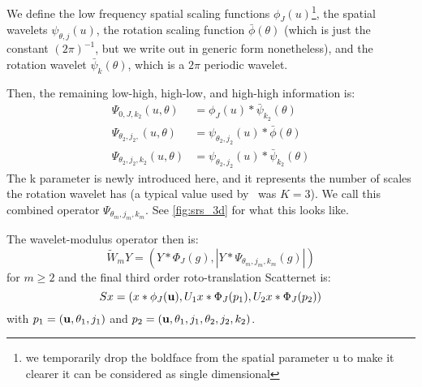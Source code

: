   We define the low frequency spatial scaling functions $\phi_J(u)$\footnote{we
  temporarily drop the boldface from the spatial parameter u to make it clearer
  it can be considered as single dimensional}, the spatial wavelets
  $\psi_{\theta, j}(u)$, the rotation scaling function $\bar{\phi}(\theta)$
  (which is just the constant $(2\pi)^{-1}$, but we write out in generic form
  nonetheless), and the rotation wavelet $\bar{\psi}_k(\theta)$, which is
  a $2\pi$ periodic wavelet.

  Then, the remaining low-high, high-low, and high-high information is:
  \begin{align}
    \Psi_{0, J, k_2}(u, \theta) & =  \phi_J(u) \ast \bar{\psi}_{k_2}(\theta) \\
    \Psi_{\theta_2, j_2, } (u, \theta) & =  \psi_{\theta_2, j_2}(u) \ast
      \bar{\phi}(\theta) \\
    \Psi_{\theta_2, j_2, k_2}(u, \theta) & =  \psi_{\theta_2, j_2}(u) \ast
      \bar{\psi}_{k_2}(\theta)
  \end{align}
  The k parameter is newly introduced here, and it represents the number of
  scales the rotation wavelet has (a typical value used by \Sifre\ was $K=3$).
  We call this combined operator $\Psi_{\theta_m, j_m, k_m}$. See
  \autoref{fig:srs_3d} for what this looks like.


  The wavelet-modulus operator then is:
  \begin{equation}
    \tilde{W}_m Y = \left( Y \ast \Phi_J(g), |Y \ast \Psi_{\theta_m, j_m, k_m}
      (g)| \right)
  \end{equation}
  for $m\ge 2$ and the final third order roto-translation Scatternet is:
  \begin{equation}
    Sx = (x\ast \phi_J(\mathbf{u}), U_1x \ast \Phi_J(p_1), U_2x \ast \Phi_J(p_2))
    \label{eq:roto_shift}
  \end{equation}
  with $p_1 = (\mathbf{u}, \theta_1, j_1)$ and $p_2=(\mathbf{u}, \theta_1, j_1,
  \theta_2, j_2, k_2)$.
